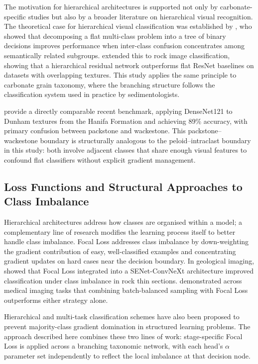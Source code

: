 \documentclass[a4paper,fleqn]{cas-dc}
\begin{document}
The motivation for hierarchical architectures is supported not only by carbonate-specific studies but also by a broader literature on hierarchical visual recognition. The theoretical case for hierarchical visual classification was established by \citet{yan2015hdcnn}, who showed that decomposing a flat multi-class problem into a tree of binary decisions improves performance when inter-class confusion concentrates among semantically related subgroups. \citet{zhang2024shn} extended this to rock image classification, showing that a hierarchical residual network outperforms flat ResNet baselines on datasets with overlapping textures. This study applies the same principle to carbonate grain taxonomy, where the branching structure follows the classification system used in practice by sedimentologists.

\citet{liudunham2023} provide a directly comparable recent benchmark, applying DenseNet121 to Dunham textures from the Hanifa Formation and achieving 89\% accuracy, with primary confusion between packstone and wackestone. This packstone--wackestone boundary is structurally analogous to the peloid--intraclast boundary in this study: both involve adjacent classes that share enough visual features to confound flat classifiers without explicit gradient management.

\subsection{Loss Functions and Structural Approaches to Class Imbalance}

Hierarchical architectures address how classes are organised within a model; a complementary line of research modifies the learning process itself to better handle class imbalance. Focal Loss \citep{lin2017focal} addresses class imbalance by down-weighting the gradient contribution of easy, well-classified examples and concentrating gradient updates on hard cases near the decision boundary. In geological imaging, \citet{dong2025} showed that Focal Loss integrated into a SENet-ConvNeXt architecture improved classification under class imbalance in rock thin sections. \citet{singh2023} demonstrated across medical imaging tasks that combining batch-balanced sampling with Focal Loss outperforms either strategy alone.

Hierarchical and multi-task classification schemes have also been proposed to prevent majority-class gradient domination in structured learning problems. The approach described here combines these two lines of work: stage-specific Focal Loss is applied across a branching taxonomic network, with each head's $\alpha$ parameter set independently to reflect the local imbalance at that decision node.
\end{document}
